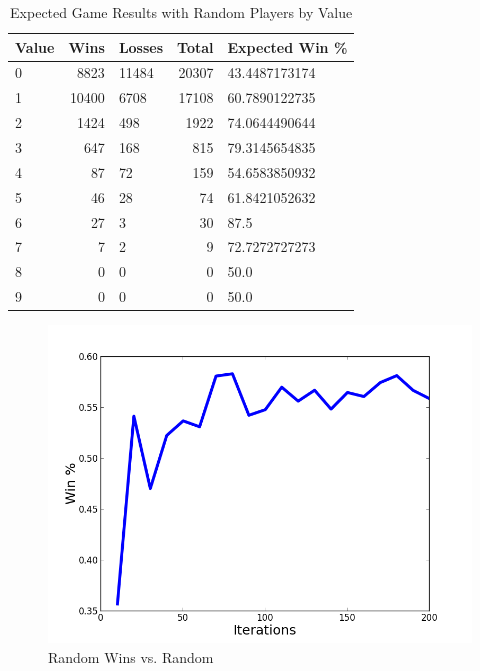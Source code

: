 \documentclass[12pt,pdftex]{article}
\begin{document}
\begin{table}[hb!]
\centering
\begin{tabular}{| l | r | l | r | l |}
	\hline
 \textbf{Value} & \textbf{Wins}& \textbf{Losses}& \textbf{Total}& \textbf{Expected Win \%}\\
\hline
0& 8823& 11484& 20307& 43.4487173174\\
1& 10400& 6708& 17108& 60.7890122735\\
2& 1424& 498& 1922& 74.0644490644\\
3& 647& 168& 815& 79.3145654835\\
4& 87& 72& 159& 54.6583850932\\
5& 46& 28& 74& 61.8421052632\\
6& 27& 3& 30& 87.5\\
7& 7& 2& 9& 72.7272727273\\
8& 0& 0& 0& 50.0\\
9& 0& 0& 0& 50.0\\
\hline
\end{tabular}
\caption{Expected Game Results with Random Players by Value}
\label{tab:rand_val_res}
\end{table}
\begin{figure}[ht!]
	\begin{center}
		\includegraphics[scale=0.5]{figs/randvrand.png}
		\caption{Random Wins vs. Random}
		\label{fig:rand_v_rand}
\end{center}
\end{figure}
\end{document}

